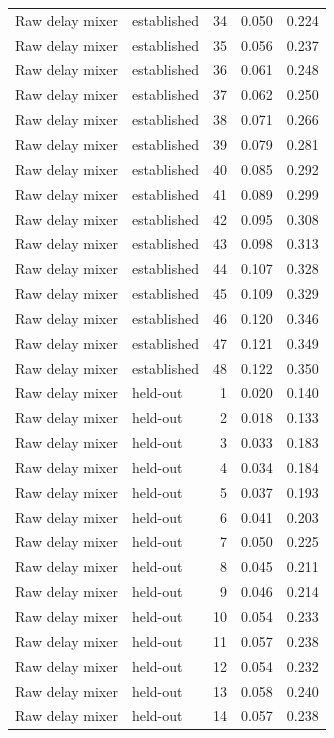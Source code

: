 \begin{tabular}{llrrr}
Raw delay mixer & established & 34 & 0.050 & 0.224 \\
Raw delay mixer & established & 35 & 0.056 & 0.237 \\
Raw delay mixer & established & 36 & 0.061 & 0.248 \\
Raw delay mixer & established & 37 & 0.062 & 0.250 \\
Raw delay mixer & established & 38 & 0.071 & 0.266 \\
Raw delay mixer & established & 39 & 0.079 & 0.281 \\
Raw delay mixer & established & 40 & 0.085 & 0.292 \\
Raw delay mixer & established & 41 & 0.089 & 0.299 \\
Raw delay mixer & established & 42 & 0.095 & 0.308 \\
Raw delay mixer & established & 43 & 0.098 & 0.313 \\
Raw delay mixer & established & 44 & 0.107 & 0.328 \\
Raw delay mixer & established & 45 & 0.109 & 0.329 \\
Raw delay mixer & established & 46 & 0.120 & 0.346 \\
Raw delay mixer & established & 47 & 0.121 & 0.349 \\
Raw delay mixer & established & 48 & 0.122 & 0.350 \\
Raw delay mixer & held-out & 1 & 0.020 & 0.140 \\
Raw delay mixer & held-out & 2 & 0.018 & 0.133 \\
Raw delay mixer & held-out & 3 & 0.033 & 0.183 \\
Raw delay mixer & held-out & 4 & 0.034 & 0.184 \\
Raw delay mixer & held-out & 5 & 0.037 & 0.193 \\
Raw delay mixer & held-out & 6 & 0.041 & 0.203 \\
Raw delay mixer & held-out & 7 & 0.050 & 0.225 \\
Raw delay mixer & held-out & 8 & 0.045 & 0.211 \\
Raw delay mixer & held-out & 9 & 0.046 & 0.214 \\
Raw delay mixer & held-out & 10 & 0.054 & 0.233 \\
Raw delay mixer & held-out & 11 & 0.057 & 0.238 \\
Raw delay mixer & held-out & 12 & 0.054 & 0.232 \\
Raw delay mixer & held-out & 13 & 0.058 & 0.240 \\
Raw delay mixer & held-out & 14 & 0.057 & 0.238 \\

\end{tabular}
